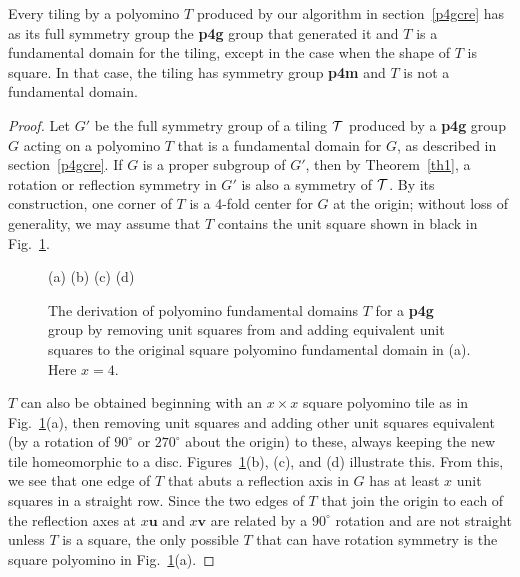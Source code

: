 \documentclass{ws-ijcga}
\begin{document}
\begin{theorem}
\label{th2}
Every tiling by a polyomino $T$ produced by our algorithm in section~\ref{p4gcre} has as its
full symmetry group the {\bf p4g} group that generated it and $T$ is a fundamental domain for the tiling,
except in the case when the shape of $T$ is square. 
In that case, the tiling has symmetry group {\bf p4m} and $T$ is not a fundamental domain.
\end{theorem}

\begin{proof}
Let $G'$ be the full symmetry group of a tiling $\cal T$ produced by a {\bf p4g} group $G$ acting on a
polyomino $T$ that is a fundamental domain for $G$, as described in section~\ref{p4gcre}. 
If $G$ is a proper
subgroup of $G'$, then by Theorem~\ref{th1}, 
a rotation or reflection symmetry in $G'$ is also a symmetry of $\cal T$. 
By its construction, one corner of $T$ is a 4-fold center for $G$ at the origin; 
without loss of generality, we may assume that $T$ contains the unit square shown in black in Fig.~\ref{X}. 
\begin{figure}[h]
\centerline{
}
\centerline{(a) \hspace{1.0cm} (b) \hspace{1.0cm} (c) \hspace{1.0cm} (d)}
\vspace*{8pt}
\caption{
The derivation of polyomino fundamental domains $T$ for a {\bf p4g} group by removing unit squares from and
adding equivalent unit squares to the original square polyomino fundamental domain in (a). Here $x = 4$.
\label{X}
}
\end{figure}
$T$ can also be obtained beginning with an $x \times x$ square polyomino tile as in Fig.~\ref{X}(a), 
then removing unit squares and adding other unit squares equivalent (by a rotation of $90^\circ$ or $270^\circ$ about 
the origin) to
these, always keeping the new tile homeomorphic to a disc. 
Figures~\ref{X}(b), (c), and (d) illustrate this. 
From this, we see that one edge of $T$ that abuts a reflection axis in $G$ has at least $x$ unit
squares in a straight row. Since the two edges of $T$ that join the origin to each of the reflection
axes at $x {\mathbf u}$ and $x {\mathbf v}$ are related by a $90^\circ$ rotation and 
are not straight unless $T$ is a square, 
the only possible $T$ that can have rotation symmetry is the square polyomino in Fig.~\ref{X}(a).


\end{proof}
\end{document}
